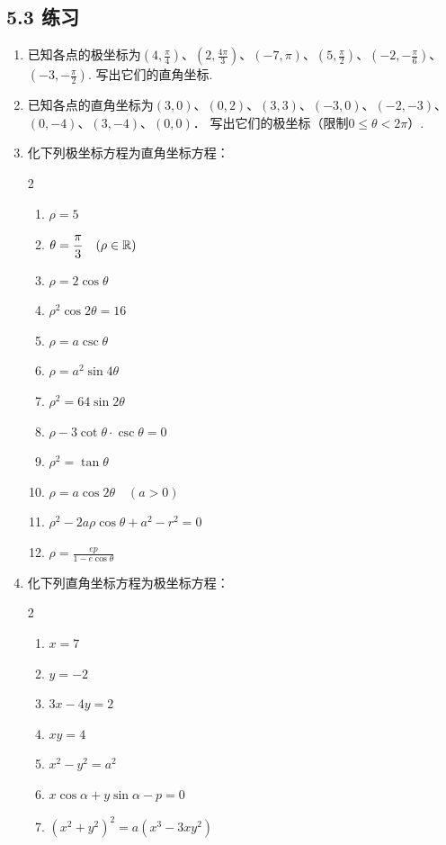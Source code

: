 \subsection*{5.3 练习}
\begin{enumerate}
    \item 已知各点的极坐标为$\left(4,\frac{\pi}{4}\right)$、$\left(2,\frac{4\pi}{3}\right)$、$\left(-7,\pi\right)$、$\left(5,\frac{\pi}{2}\right)$、$\left(-2,-\frac{\pi}{6}\right)$、$\left(-3,-\frac{\pi}{2}\right)$. 写出它们的直角坐标.
    \item 已知各点的直角坐标为$(3,0)$、$(0,2)$、$(3,3)$、$(-3,0)$、$(-2,-3)$、$(0,-4)$、$(3,-4)$、$(0,0)$．
写出它们的极坐标（限制$0\le \theta<2\pi$）.
    \item 化下列极坐标方程为直角坐标方程：
\begin{multicols}{2}
\begin{enumerate}[(1)]
    \item $\rho=5$
    \item $\theta=\dfrac{\pi}{3}\quad (\rho\in\mathbb{R})$
    \item $\rho=2\cos\theta$
    \item $\rho^2\cos2\theta=16$
    \item $\rho=a\csc\theta$
    \item $\rho=a^2\sin4\theta$
    \item $\rho^2=64\sin2\theta$
    \item $\rho-3\cot\theta\cdot \csc\theta=0$
    \item $\rho^2=\tan\theta$
    \item $\rho=a\cos2\theta\quad (a>0)$
    \item $\rho^2-2a\rho\cos\theta+a^2-r^2=0$
    \item $\rho=\frac{ep}{1-e\cos\theta}$
\end{enumerate}
\end{multicols}
\item 化下列直角坐标方程为极坐标方程：
\begin{multicols}{2}
\begin{enumerate}[(1)]
    \item $x=7$
    \item $y=-2$
    \item $3x-4y=2$
    \item $xy=4$
    \item $x^2-y^2=a^2$
    \item $x\cos\alpha+y\sin\alpha-p=0$
    \item $(x^2+y^2)^2=a(x^3-3xy^2)$ 
    

\end{enumerate}
\end{multicols}
\end{enumerate}
